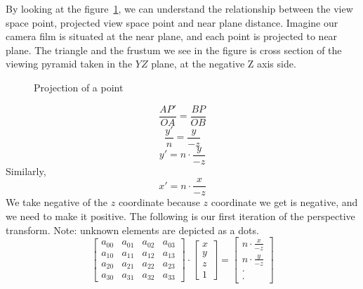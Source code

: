 By looking at the figure~\ref{fig:projection-figure}, we can understand the relationship between the view space point, projected view space point and near plane distance. Imagine our camera film is situated at the near plane, and each point is projected to near plane. The triangle and the frustum we see in the figure is cross section of the viewing pyramid taken in the $YZ$ plane,  at the negative Z axis side.
\begin{figure}
\caption{Projection of a point}
\label{fig:projection-figure}
\end{figure}
\[
\frac{AP'}{OA} = \frac{BP}{OB}
\]
\[
\frac{y'}{n} = \frac{y}{-z}
\]
\[
y' = n \cdot \frac{y}{-z} 
\]
Similarly,
\[
x' = n \cdot \frac{x}{-z} 
\]
We take negative of the $z$ coordinate because $z$ coordinate we get is negative, and we need to make it positive.
The following is our first iteration of the perspective transform. Note: unknown elements are depicted as a dots.
\[
\begin{bmatrix}
a_{00} & a_{01} & a_{02} & a_{03} \\
a_{10} & a_{11} & a_{12} & a_{13} \\
a_{20} & a_{21} & a_{22} & a_{23} \\
a_{30} & a_{31} & a_{32} & a_{33}
\end{bmatrix}
\cdot
\begin{bmatrix}
x \\
y \\
z \\
1
\end{bmatrix}
=
\begin{bmatrix}
n \cdot \frac{x}{-z}   \\
n \cdot \frac{y}{-z}  \\
\cdot \\
\cdot
\end{bmatrix}
\]
